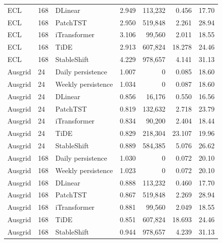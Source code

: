 {\begin{longtable}{llp{3.4cm}rrrr}
ECL & 168 & DLinear & 2.949 & 113,232 & 0.456 & 17.70 \\
ECL & 168 & PatchTST & 2.950 & 519,848 & 2.261 & 28.94 \\
ECL & 168 & iTransformer & 3.106 & 99,560 & 2.011 & 18.55 \\
ECL & 168 & TiDE & 2.913 & 607,824 & 18.278 & 24.46 \\
ECL & 168 & StableShift & 4.229 & 978,657 & 4.141 & 31.13 \\
Ausgrid & 24 & Daily persistence & 1.007 & 0 & 0.085 & 18.60 \\
Ausgrid & 24 & Weekly persistence & 1.034 & 0 & 0.087 & 18.60 \\
Ausgrid & 24 & DLinear & 0.856 & 16,176 & 0.550 & 16.56 \\
Ausgrid & 24 & PatchTST & 0.819 & 132,632 & 2.718 & 23.79 \\
Ausgrid & 24 & iTransformer & 0.834 & 90,200 & 2.404 & 18.44 \\
Ausgrid & 24 & TiDE & 0.829 & 218,304 & 23.107 & 19.96 \\
Ausgrid & 24 & StableShift & 0.889 & 584,385 & 5.076 & 26.62 \\
Ausgrid & 168 & Daily persistence & 1.030 & 0 & 0.072 & 20.10 \\
Ausgrid & 168 & Weekly persistence & 1.023 & 0 & 0.072 & 20.10 \\
Ausgrid & 168 & DLinear & 0.888 & 113,232 & 0.460 & 17.70 \\
Ausgrid & 168 & PatchTST & 0.867 & 519,848 & 2.269 & 28.94 \\
Ausgrid & 168 & iTransformer & 0.881 & 99,560 & 2.049 & 18.55 \\
Ausgrid & 168 & TiDE & 0.851 & 607,824 & 18.693 & 24.46 \\
Ausgrid & 168 & StableShift & 0.944 & 978,657 & 4.239 & 31.13 \\
\bottomrule
\end{longtable}
}
